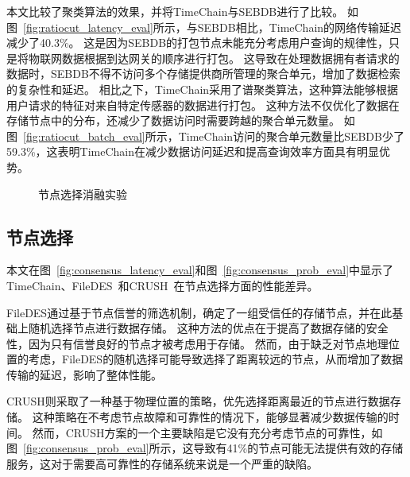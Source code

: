 本文比较了聚类算法的效果，并将TimeChain与SEBDB进行了比较。
如图~\autoref{fig:ratiocut_latency_eval}所示，与SEBDB相比，TimeChain的网络传输延迟减少了40.3\%。
这是因为SEBDB的打包节点未能充分考虑用户查询的规律性，只是将物联网数据根据到达网关的顺序进行打包。
这导致在处理数据拥有者请求的数据时，SEBDB不得不访问多个存储提供商所管理的聚合单元，增加了数据检索的复杂性和延迟。
相比之下，TimeChain采用了谱聚类算法，这种算法能够根据用户请求的特征对来自特定传感器的数据进行打包。
这种方法不仅优化了数据在存储节点中的分布，还减少了数据访问时需要跨越的聚合单元数量。
如图~\autoref{fig:ratiocut_batch_eval}所示，TimeChain访问的聚合单元数量比SEBDB少了59.3\%，这表明TimeChain在减少数据访问延迟和提高查询效率方面具有明显优势。

\begin{figure*}[t]
    \centering
    \begin{minipage}{1\linewidth}
        \quad
        \caption{节点选择消融实验} 
    \end{minipage}
\end{figure*}

\subsection{节点选择}
本文在图~\autoref{fig:consensus_latency_eval}和图~\autoref{fig:consensus_prob_eval}中显示了TimeChain、FileDES~\cite{xu2024filedes}和CRUSH~\cite{weil2006ceph}在节点选择方面的性能差异。

FileDES通过基于节点信誉的筛选机制，确定了一组受信任的存储节点，并在此基础上随机选择节点进行数据存储。
这种方法的优点在于提高了数据存储的安全性，因为只有信誉良好的节点才被考虑用于存储。
然而，由于缺乏对节点地理位置的考虑，FileDES的随机选择可能导致选择了距离较远的节点，从而增加了数据传输的延迟，影响了整体性能。

CRUSH则采取了一种基于物理位置的策略，优先选择距离最近的节点进行数据存储。
这种策略在不考虑节点故障和可靠性的情况下，能够显著减少数据传输的时间。
然而，CRUSH方案的一个主要缺陷是它没有充分考虑节点的可靠性，如图~\autoref{fig:consensus_prob_eval}所示，这导致有41\%的节点可能无法提供有效的存储服务，这对于需要高可靠性的存储系统来说是一个严重的缺陷。

